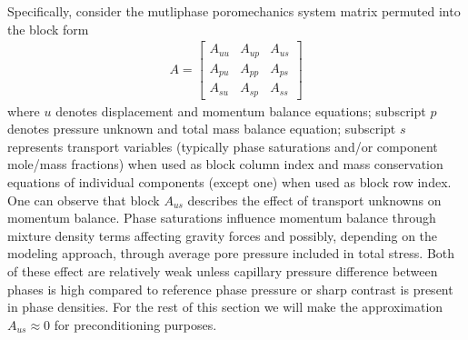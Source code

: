 Specifically, consider the mutliphase poromechanics system matrix permuted into the block form
\begin{align}
    A = 
    \begin{bmatrix}
        A_{uu} & A_{up} & A_{us} \\
        A_{pu} & A_{pp} & A_{ps} \\
        A_{su} & A_{sp} & A_{ss}
    \end{bmatrix}
    \label{eq:multiphase_poromechanics_block_form}
\end{align}
where $u$ denotes displacement and momentum balance equations; subscript $p$ denotes pressure unknown and total mass balance equation; subscript $s$ represents transport variables (typically phase saturations and/or component mole/mass fractions) when used as block column index and mass conservation equations of individual components (except one) when used as block row index.   One can observe that block $A_{us}$ describes the effect of transport unknowns on momentum balance.   Phase saturations influence momentum balance through mixture density terms affecting gravity forces and possibly, depending on the modeling approach, through average pore pressure included in total stress.   Both of these effect are relatively weak unless capillary pressure difference between phases is high compared to reference phase pressure or sharp contrast is present in phase densities.   For the rest of this section we will make the approximation $A_{us} \approx 0$ for preconditioning purposes.


